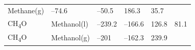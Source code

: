 \documentclass[
  9pt,
]{extbook}
\theoremstyle{definition}
\theoremstyle{definition}
\theoremstyle{definition}
\theoremstyle{remark}
\begin{document}
\begin{longtable}[]{@{}llllll@{}}
\begin{minipage}[t]{0.17\columnwidth}
Methane(g)\strut
\end{minipage} & \begin{minipage}[t]{0.15\columnwidth}\raggedright
--74.6\strut
\end{minipage} & \begin{minipage}[t]{0.15\columnwidth}\raggedright
--50.5\strut
\end{minipage} & \begin{minipage}[t]{0.14\columnwidth}\raggedright
186.3\strut
\end{minipage} & \begin{minipage}[t]{0.14\columnwidth}\raggedright
35.7\strut
\end{minipage}\tabularnewline
\begin{minipage}[t]{0.07\columnwidth}\raggedright
CH\textsubscript{4}O\strut
\end{minipage} & \begin{minipage}[t]{0.17\columnwidth}\raggedright
Methanol(l)\strut
\end{minipage} & \begin{minipage}[t]{0.15\columnwidth}\raggedright
--239.2\strut
\end{minipage} & \begin{minipage}[t]{0.15\columnwidth}\raggedright
--166.6\strut
\end{minipage} & \begin{minipage}[t]{0.14\columnwidth}\raggedright
126.8\strut
\end{minipage} & \begin{minipage}[t]{0.14\columnwidth}\raggedright
81.1\strut
\end{minipage}\tabularnewline
\begin{minipage}[t]{0.07\columnwidth}\raggedright
CH\textsubscript{4}O\strut
\end{minipage} & \begin{minipage}[t]{0.17\columnwidth}\raggedright
Methanol(g)\strut
\end{minipage} & \begin{minipage}[t]{0.15\columnwidth}\raggedright
--201\strut
\end{minipage} & \begin{minipage}[t]{0.15\columnwidth}\raggedright
--162.3\strut
\end{minipage} & \begin{minipage}[t]{0.14\columnwidth}\raggedright
239.9\strut
\end{minipage} & \begin{minipage}[t]{0.14\columnwidth}\raggedright

\end{minipage}
\end{longtable}
\end{document}
